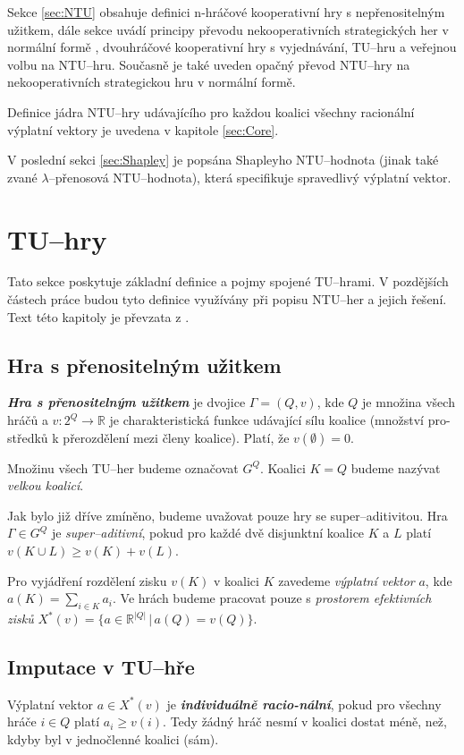     Sekce \ref{sec:NTU} obsahuje definici n-hráčové kooperativní hry s nepřenositelným užitkem, dále sekce uvádí principy převodu nekooperativních strategických her v normální formě \cite{Hruby2022NCOOP}, dvouhráčové kooperativní hry s vyjednávání, TU--hru a veřejnou volbu na NTU--hru. Současně je také uveden opačný převod NTU--hry na nekooperativních strategickou hru v normální formě.

    Definice jádra NTU--hry udávajícího pro každou koalici všechny racionální výplatní vektory je uvedena v kapitole \ref{sec:Core}.

    V poslední sekci \ref{sec:Shapley} je popsána Shapleyho NTU--hodnota (jinak také zvané $\lambda$--přenosová NTU--hodnota), která specifikuje spravedlivý výplatní vektor.


\section{TU--hry}
    \label{sec:TU}
    Tato sekce poskytuje základní definice a pojmy spojené TU--hrami. V pozdějších částech práce budou tyto definice využívány při popisu NTU--her a jejich řešení. Text této kapitoly je převzata z \cite{Hruby2022}.

    \subsection{Hra s přenositelným užitkem}
        \textit{\textbf{Hra s přenositelným užitkem}} je dvojice $\Gamma = (Q, v)$, kde $Q$ je množina všech hráčů a $v: 2^Q \rightarrow \mathbb{R}$ je charakteristická funkce udávající sílu koalice (množství pro-středků k přerozdělení mezi členy koalice). Platí, že $v(\emptyset) = 0$.

        Množinu všech TU--her budeme označovat $G^Q$. Koalici $K = Q$ budeme nazývat \textit{velkou koalicí}.

        Jak bylo již dříve zmíněno, budeme uvažovat pouze hry se super--aditivitou. Hra $\Gamma \in G^Q$ je \textit{super--aditivní}, pokud pro každé dvě disjunktní koalice $K$ a $L$ platí $v(K \cup L) \geq v(K) + v(L)$.

        Pro vyjádření rozdělení zisku $v(K)$ v koalici $K$ zavedeme \textit{výplatní vektor} $a$, kde $a(K) = \sum_{i\in K}a_i$. Ve hrách budeme pracovat pouze s \textit{prostorem efektivních zisků} $X^*(v) = \{a \in \mathbb{R}^{|Q|}\,|\,a(Q) = v(Q)\}$.

    \subsection{Imputace v TU--hře}
        Výplatní vektor $a \in X^*(v)$ je \textit{\textbf{individuálně racio-nální}}, pokud pro všechny hráče $i \in Q$ platí $a_i \geq v({i})$. Tedy žádný hráč nesmí v koalici dostat méně, než, kdyby byl v jednočlenné koalici (sám).

